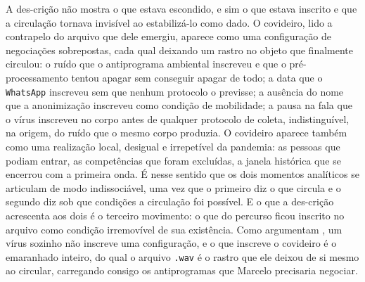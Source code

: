 A des-crição não mostra o que estava escondido, e sim o que estava inscrito e que a circulação tornava invisível ao estabilizá-lo como dado. O covideiro, lido a contrapelo do arquivo que dele emergiu, aparece como uma configuração de negociações sobrepostas, cada qual deixando um rastro no objeto que finalmente circulou: o ruído que o antiprograma ambiental inscreveu e que o pré-processamento tentou apagar sem conseguir apagar de todo; a data que o \texttt{WhatsApp} inscreveu sem que nenhum protocolo o previsse; a ausência do nome que a anonimização inscreveu como condição de mobilidade; a pausa na fala que o vírus inscreveu no corpo antes de qualquer protocolo de coleta, indistinguível, na origem, do ruído que o mesmo corpo produzia. O covideiro aparece também como uma realização local, desigual e irrepetível da pandemia: as pessoas que podiam entrar, as competências que foram excluídas, a janela histórica que se encerrou com a primeira onda. É nesse sentido que os dois momentos analíticos se articulam de modo indissociável, uma vez que o primeiro diz o que circula e o segundo diz sob que condições a circulação foi possível. E o que a des-crição acrescenta aos dois é o terceiro movimento: o que do percurso ficou inscrito no arquivo como condição irremovível de sua existência. Como argumentam \textcite{Segata2021Covid}, um vírus sozinho não inscreve uma configuração, e o que inscreve o covideiro é o emaranhado inteiro, do qual o arquivo \texttt{.wav} é o rastro que ele deixou de si mesmo ao circular, carregando consigo os antiprogramas que Marcelo precisaria negociar.

